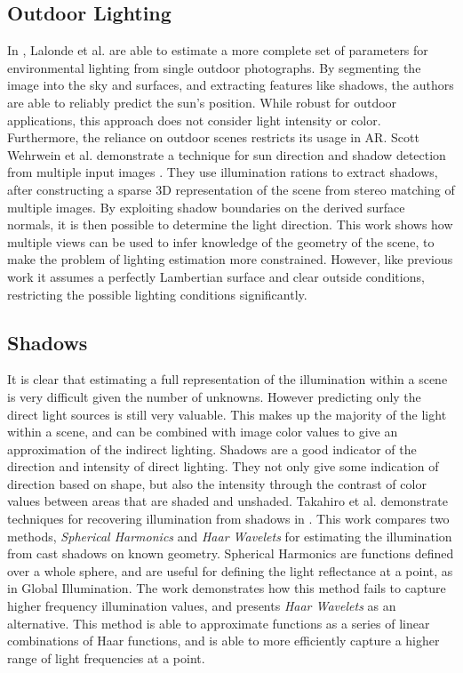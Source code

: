 \documentclass[ %
                    author={Gavin Parker},
                supervisor={Dr. Neill Campbell},
                    degree={MEng},
                     title={Deep Learning for Illumination Estimation from Stereo Images},
                  subtitle={},
                      type={Research},
                      year={2018} ]{dissertation}
\begin{document}
\subsection{Outdoor Lighting}
In \cite{Lalonde-2009-10350}, Lalonde et al. are able to estimate a more complete set of parameters for environmental lighting from single outdoor photographs. By segmenting the image into the sky and surfaces, and extracting features like shadows, the authors are able to reliably predict the sun's position. While robust for outdoor applications, this approach does not consider light intensity or color. Furthermore, the reliance on outdoor scenes restricts its usage in AR.
Scott Wehrwein et al. demonstrate a technique for sun direction and shadow detection from multiple input images \cite{7335515}. They use illumination rations to extract shadows, after constructing a sparse 3D representation of the scene from stereo matching of multiple images. By exploiting shadow boundaries on the derived surface normals, it is then possible to determine the light direction. This work shows how multiple views can be used to infer knowledge of the geometry of the scene, to make the problem of lighting estimation more constrained. However, like previous work it assumes a perfectly Lambertian surface and clear outside conditions, restricting the possible lighting conditions significantly.
\subsection{Shadows}
It is clear that estimating a full representation of the illumination within a scene is very difficult given the number of unknowns. However predicting only the direct light sources is still very valuable. This makes up the majority of the light within a scene, and can be combined with image color values to give an approximation of the indirect lighting. Shadows are a good indicator of the direction and intensity of direct lighting. They not only give some indication of direction based on shape, but also the intensity through the contrast of color values between areas that are shaded and unshaded. Takahiro et al. demonstrate techniques for recovering illumination from shadows in \cite{1315013}. This work compares two methods, \textit{Spherical Harmonics} and \textit{Haar Wavelets} for estimating the illumination from cast shadows on known geometry. Spherical Harmonics are functions defined over a whole sphere, and are useful for defining the light reflectance at a point, as in Global Illumination. The work demonstrates how this method fails to capture higher frequency illumination values, and presents \textit{Haar Wavelets} as an alternative. This method is able to approximate functions as a series of linear combinations of Haar functions, and is able to more efficiently capture a higher range of light frequencies at a point.
\end{document}
